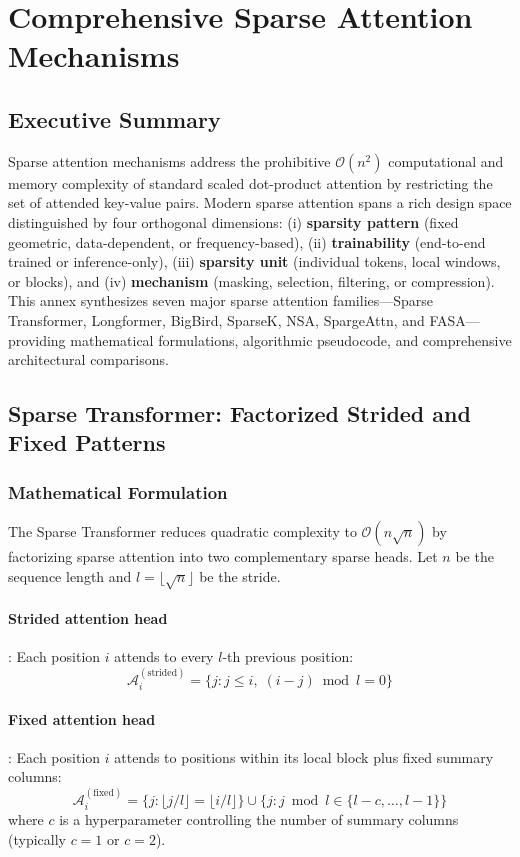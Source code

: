 \section{Comprehensive Sparse Attention Mechanisms}
\label{sec:annex-sparse}

\subsection{Executive Summary}

Sparse attention mechanisms address the prohibitive $\mathcal{O}(n^2)$ computational and memory complexity of standard scaled dot-product attention by restricting the set of attended key-value pairs. Modern sparse attention spans a rich design space distinguished by four orthogonal dimensions: (i) \textbf{sparsity pattern} (fixed geometric, data-dependent, or frequency-based), (ii) \textbf{trainability} (end-to-end trained or inference-only), (iii) \textbf{sparsity unit} (individual tokens, local windows, or blocks), and (iv) \textbf{mechanism} (masking, selection, filtering, or compression). This annex synthesizes seven major sparse attention families---Sparse Transformer, Longformer, BigBird, SparseK, NSA, SpargeAttn, and FASA---providing mathematical formulations, algorithmic pseudocode, and comprehensive architectural comparisons.

\subsection{Sparse Transformer: Factorized Strided and Fixed Patterns}

\subsubsection{Mathematical Formulation}

The Sparse Transformer \citep{child_sparse_transformer_2019} reduces quadratic complexity to $\mathcal{O}(n\sqrt{n})$ by factorizing sparse attention into two complementary sparse heads. Let $n$ be the sequence length and $l = \lfloor\sqrt{n}\rfloor$ be the stride.

\paragraph{Strided attention head}: Each position $i$ attends to every $l$-th previous position:
\[
\mathcal{A}_i^{(\text{strided})} = \{j : j \leq i,\; (i - j) \bmod l = 0\}
\]

\paragraph{Fixed attention head}: Each position $i$ attends to positions within its local block plus fixed summary columns:
\[
\mathcal{A}_i^{(\text{fixed})} = \{j : \lfloor j/l \rfloor = \lfloor i/l \rfloor\} \cup \{j : j \bmod l \in \{l-c, \ldots, l-1\}\}
\]
where $c$ is a hyperparameter controlling the number of summary columns (typically $c=1$ or $c=2$).


